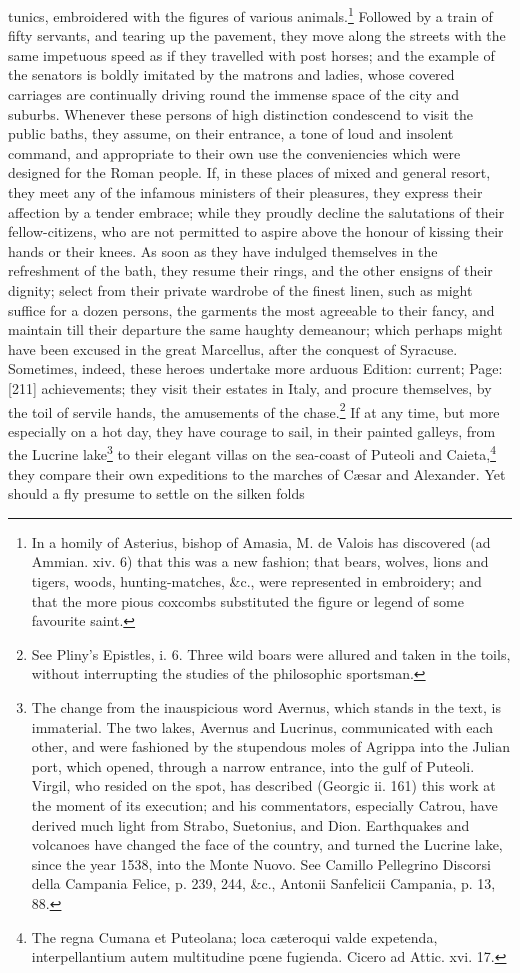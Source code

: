 {tunics, embroidered with the figures of various animals.\footnote{In a homily of Asterius, bishop of Amasia, M. de Valois has discovered (ad Ammian. xiv. 6) that this was a new fashion; that bears, wolves, lions and tigers, woods, hunting-matches, \&c., were represented in embroidery; and that the more pious coxcombs substituted the figure or legend of some favourite saint.} Followed by a train of fifty servants, and tearing up the pavement, they move along the streets with the same impetuous speed as if they travelled with post horses; and the example of the senators is boldly imitated by the matrons and ladies, whose covered carriages are continually driving round the immense space of the city and suburbs. Whenever these persons of high distinction condescend to visit the public baths, they assume, on their entrance, a tone of loud and insolent command, and appropriate to their own use the conveniencies which were designed for the Roman people. If, in these places of mixed and general resort, they meet any of the infamous ministers of their pleasures, they express their affection by a tender embrace; while they proudly decline the salutations of their fellow-citizens, who are not permitted to aspire above the honour of kissing their hands or their knees. As soon as they have indulged themselves in the refreshment of the bath, they resume their rings, and the other ensigns of their dignity; select from their private wardrobe of the finest linen, such as might suffice for a dozen persons, the garments the most agreeable to their fancy, and maintain till their departure the same haughty demeanour; which perhaps might have been excused in the great Marcellus, after the conquest of Syracuse. Sometimes, indeed, these heroes undertake more arduous Edition: current; Page: [211] achievements; they visit their estates in Italy, and procure themselves, by the toil of servile hands, the amusements of the chase.\footnote{See Pliny\texthebrew{}’s Epistles, i. 6. Three wild boars were allured and taken in the toils, without interrupting the studies of the philosophic sportsman.} If at any time, but more especially on a hot day, they have courage to sail, in their painted galleys, from the Lucrine lake\footnote{The change from the inauspicious word Avernus, which stands in the text, is immaterial. The two lakes, Avernus and Lucrinus, communicated with each other, and were fashioned by the stupendous moles of Agrippa into the Julian port, which opened, through a narrow entrance, into the gulf of Puteoli. Virgil, who resided on the spot, has described (Georgic ii. 161) this work at the moment of its execution; and his commentators, especially Catrou, have derived much light from Strabo, Suetonius, and Dion. Earthquakes and volcanoes have changed the face of the country, and turned the Lucrine lake, since the year 1538, into the Monte Nuovo. See Camillo Pellegrino Discorsi della Campania Felice, p. 239, 244, \&c., Antonii Sanfelicii Campania, p. 13, 88.} to their elegant villas on the sea-coast of Puteoli and Caieta,\footnote{The regna Cumana et Puteolana; loca cæteroqui valde expetenda, interpellantium autem multitudine pœne fugienda. Cicero ad Attic. xvi. 17.} they compare their own expeditions to the marches of Cæsar and Alexander. Yet should a fly presume to settle on the silken folds }
